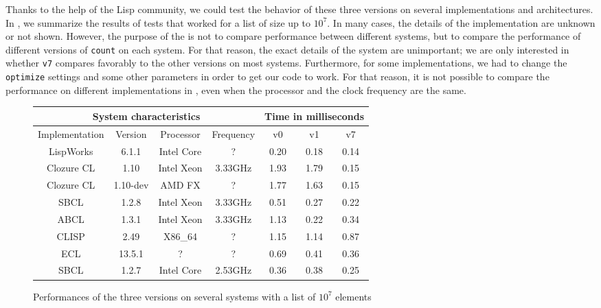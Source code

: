 
Thanks to the help of the Lisp community, we could test the behavior
of these three versions on several implementations and architectures.
In , we summarize the results of tests that worked
for a list of size up to $10^7$.  In many cases, the details of the
implementation are unknown or not shown.  However, the purpose of the
 is not to compare performance between different
systems, but to compare the performance of different versions of
\texttt{count} on each system.  For that reason, the exact details of
the system are unimportant; we are only interested in whether
\texttt{v7} compares favorably to the other versions on most systems.
Furthermore, for some implementations, we had to change the
\texttt{optimize} settings and some other parameters in order to get
our code to work.  For that reason, it is not possible to compare the
performance on different implementations in , even
when the processor and the clock frequency are the same.

\begin{figure}[htb]
\centering
\begin{tabular}{|c|c|c|c|c|c|c|}
\hline
\multicolumn{4}{|c|}{System characteristics}  & \multicolumn{3}{|c|}{Time in milliseconds}\\ \hline
Implementation & Version      & Processor                  & Frequency          & v0 & v1 & v7 \\ \hline
LispWorks  & 6.1.1            & Intel Core &  ?                 & 0.20 & 0.18 & 0.14 \\ \hline
Clozure CL & 1.10     & Intel Xeon & 3.33GHz            & 1.93 & 1.79 & 0.15 \\ \hline
Clozure CL & 1.10-dev & AMD FX & ? & 1.77 & 1.63 & 0.15 \\ \hline
SBCL       & 1.2.8 & Intel Xeon & 3.33GHz            & 0.51 & 0.27 & 0.22 \\ \hline
ABCL       & 1.3.1            & Intel Xeon & 3.33GHz            & 1.13 & 0.22 & 0.34 \\ \hline
CLISP      & 2.49             & X86\_64                    &   ?                & 1.15 & 1.14 & 0.87 \\ \hline
ECL        & 13.5.1           & ?                          &   ?                & 0.69 & 0.41 & 0.36 \\ \hline
SBCL       & 1.2.7 & Intel Core & 2.53GHz      & 0.36 & 0.38 & 0.25 \\ \hline
\end{tabular}
\caption{\label{f-systems} Performances of the three versions on several systems with a list of $10^7$ elements}
\end{figure}

